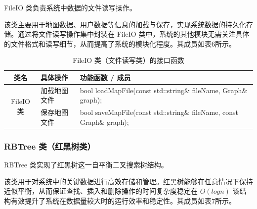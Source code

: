 \documentclass[UTF8,12pt,a4paper]{ctexart}
\begin{document}
FileIO 类负责系统中数据的文件读写操作。

该类主要用于地图数据、用户数据等信息的加载与保存，实现系统数据的持久化存储。通过将文件读写操作集中封装在 FileIO 类中，系统的其他模块无需关注具体的文件格式和读写细节，从而提高了系统的模块化程度。其成员如表6所示。

\begin{table}[H]
\centering
\caption{FileIO 类（文件读写类）的接口函数}
\renewcommand{\arraystretch}{1.3}
\begin{tabular}{|
c|
>{\centering\arraybackslash}m{4cm}|
>{\centering\arraybackslash}m{9cm}|}
\hline
\textbf{类名} & \textbf{具体操作} & \textbf{功能函数 / 成员} \\
\hline
\multirow{2}{*}{FileIO 类}
& 加载地图文件
& bool loadMapFile(const std::string\& fileName, Graph\& graph); \\
\cline{2-3}

& 保存地图文件
& bool saveMapFile(const std::string\& fileName, const Graph\& graph); \\
\hline
\end{tabular}
\end{table}


\subsubsection{RBTree 类（红黑树类）}

RBTree 类实现了红黑树这一自平衡二叉搜索树结构。

该类用于对系统中的关键数据进行高效存储和管理。红黑树能够在任意情况下保持近似平衡，从而保证查找、插入和删除操作的时间复杂度稳定在 $O(logn)$ 该结构有效提升了系统在数据量较大时的运行效率和稳定性。其成员如表7所示。
\end{document}
